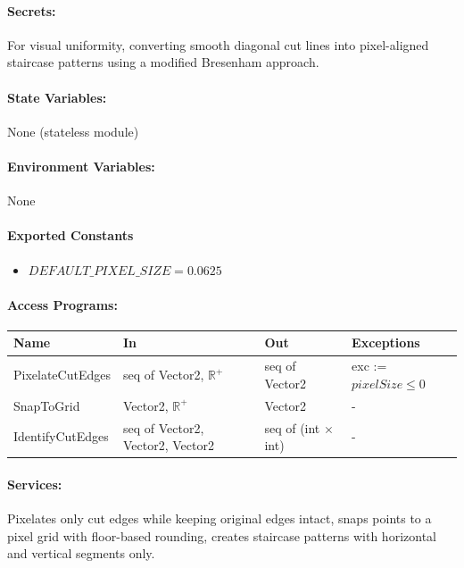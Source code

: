 \documentclass[12pt, titlepage]{article}
\begin{document}
\paragraph{Secrets:}
For visual uniformity, converting smooth diagonal cut lines into pixel-aligned staircase patterns using a modified Bresenham approach.

\paragraph{State Variables:}
None (stateless module)

\paragraph{Environment Variables:}
None

\paragraph{Exported Constants}
\begin{itemize}
\item $DEFAULT\_PIXEL\_SIZE = 0.0625$
\end{itemize}

\paragraph{Access Programs:}

\begin{center}
\begin{tabular}{p{33mm}p{3cm}p{3cm}p{4cm}}
\toprule
\textbf{Name} & \textbf{In} & \textbf{Out} & \textbf{Exceptions} \\
\midrule
PixelateCutEdges & seq of Vector2, $\mathbb{R}^+$ & seq of Vector2 & exc := $pixelSize \leq 0$ \\
SnapToGrid & Vector2, $\mathbb{R}^+$ & Vector2 & - \\
IdentifyCutEdges & seq of Vector2, Vector2, Vector2 & seq of (int $\times$ int) & - \\
\bottomrule
\end{tabular}
\end{center}

\paragraph{Services:}
Pixelates only cut edges while keeping original edges intact, snaps points to a pixel grid with floor-based rounding, creates staircase patterns with horizontal and vertical segments only.
\end{document}
